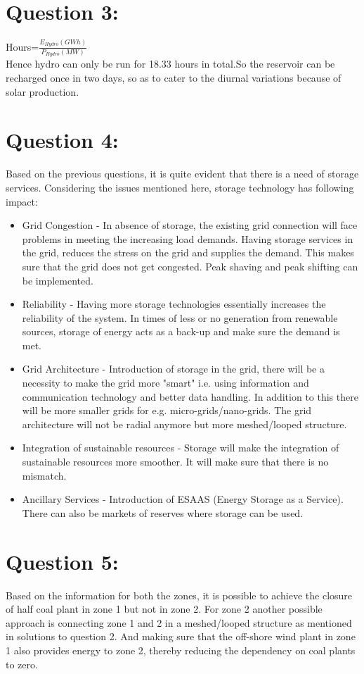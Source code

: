 \section*{\textbf{Question 3:}}

Hours=$\frac{{{E}_{Hydro}}(GWh)}{{{P}_{Hydro}}(MW)}$
\\
Hence hydro can only be run for 18.33 hours in total.So the reservoir can be recharged once in two days, so as to cater to the diurnal variations because of solar production.





\section*{\textbf{Question 4:}}
 Based on the previous questions, it is quite evident that there is a need of storage services. Considering the issues mentioned here, storage technology has following impact:
 \begin{itemize}
     \item  Grid Congestion - In absence of storage, the existing grid connection will face problems in meeting the increasing load demands. Having storage services in the grid, reduces the stress on the grid and supplies the demand. This makes sure that the grid does not get congested. Peak shaving and peak shifting can be implemented.
     \item Reliability - Having more storage technologies essentially increases the reliability of the system. In times of less or no generation from renewable sources, storage of energy acts as a back-up and make sure the demand is met.
     \item Grid Architecture -  Introduction of storage in the grid, there will be a necessity to make the grid more "smart" i.e. using information and communication technology and better data handling. In addition to this there will be  more smaller grids for e.g. micro-grids/nano-grids. The grid architecture will not be radial anymore but more meshed/looped structure.
     \item Integration of sustainable resources - Storage will make the integration of sustainable resources more smoother. It will make sure that there is no mismatch.
     \item Ancillary Services - Introduction of ESAAS (Energy Storage as a Service). There can also be markets of reserves where storage can be used. 
 \end{itemize}     
\section*{\textbf{Question 5:}}
Based on the information for both the zones, it is possible to achieve the closure of half coal plant in zone 1 but not in zone 2. For zone 2 another possible approach is connecting zone 1 and 2 in a meshed/looped structure as mentioned in solutions to question 2. And making sure that the off-shore wind plant in zone 1 also provides energy to zone 2, thereby reducing the dependency on coal plants to zero.  
